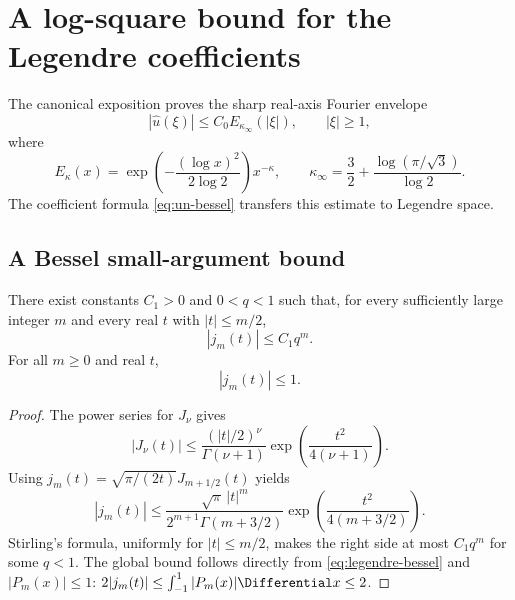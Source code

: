 \documentclass[11pt,oneside]{article}
\numberwithin{equation}{section}
\theoremstyle{definition}
\theoremstyle{remark}
\begin{document}
\section{A log-square bound for the Legendre coefficients}
\label{sec:decay}

The canonical exposition proves the sharp real-axis Fourier envelope
\begin{equation}
 |\widehat u(\xi)|\le C_0E_{\kappa_\infty}(|\xi|),
 \qquad |\xi|\ge1,
 \label{eq:fourier-envelope}
\end{equation}
where
\begin{equation}
 E_\kappa(x)=
 \exp\!\left(-\frac{(\log x)^2}{2\log2}\right)x^{-\kappa},
 \qquad
 \kappa_\infty=\frac32+\frac{\log(\pi/\sqrt3)}{\log2}.
 \label{eq:decay-gauge}
\end{equation}
The coefficient formula \eqref{eq:un-bessel} transfers this estimate to
Legendre space.

\subsection{A Bessel small-argument bound}

\begin{lemma}
\label{lem:bessel-suppression}
There exist constants $C_1>0$ and $0<q<1$ such that, for every sufficiently
large integer $m$ and every real $t$ with $|t|\le m/2$,
\begin{equation}
 |j_m(t)|\le C_1q^m.
 \label{eq:bessel-suppression}
\end{equation}
For all $m\ge0$ and real $t$,
\begin{equation}
 |j_m(t)|\le1.
 \label{eq:bessel-global-one}
\end{equation}
\end{lemma}

\begin{proof}
The power series for $J_\nu$ gives
\[
 |J_\nu(t)|\le
 \frac{(|t|/2)^\nu}{\Gamma(\nu+1)}
 \exp\!\left(\frac{t^2}{4(\nu+1)}\right).
\]
Using $j_m(t)=\sqrt{\pi/(2t)}J_{m+1/2}(t)$ yields
\begin{equation}
 |j_m(t)|\le
 \frac{\sqrt\pi\,|t|^m}{2^{m+1}\Gamma(m+3/2)}
 \exp\!\left(\frac{t^2}{4(m+3/2)}\right).
 \label{eq:bessel-series-bound}
\end{equation}
Stirling's formula, uniformly for $|t|\le m/2$, makes the right side at most
$C_1q^m$ for some $q<1$.  The global bound follows directly from
\eqref{eq:legendre-bessel} and $|P_m(x)|\le1$:
$2|j_m(t)|\le\int_{-1}^{1}|P_m(x)|\Differential x\le2$.
\end{proof}
\end{document}
